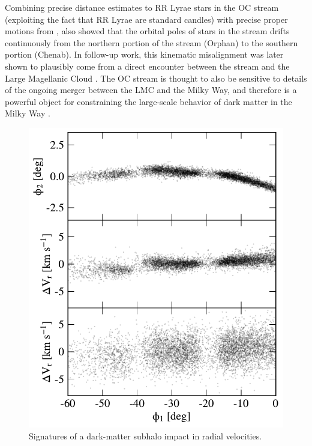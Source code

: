 \documentclass[final,5p,times,twocolumn,authoryear]{elsarticle}
\begin{document}
Combining precise distance estimates to RR Lyrae stars in the OC stream (exploiting the
fact that RR Lyrae are standard candles) with precise proper motions from \gaia,
\citet{koposov:2019} also showed that the orbital poles of stars in the stream drifts
continuously from the northern portion of the stream (Orphan) to the southern portion
(Chenab).
In follow-up work, this kinematic misalignment was later shown to plausibly come from a
direct encounter between the stream and the Large Magellanic Cloud \citep{erkal:2019}.
The OC stream is thought to also be sensitive to details of the ongoing merger
between the LMC and the Milky Way, and therefore is a powerful object for constraining
the large-scale behavior of dark matter in the Milky Way \citep{lilleengen:2023}.


\begin{figure}[t!]
\begin{center}
\includegraphics[width=\columnwidth]{figures/rv_signal.pdf}
\end{center}
\caption{%
Signatures of a dark-matter subhalo impact in radial velocities.
\label{fig:rv_signal}
}
\end{figure}
\end{document}

